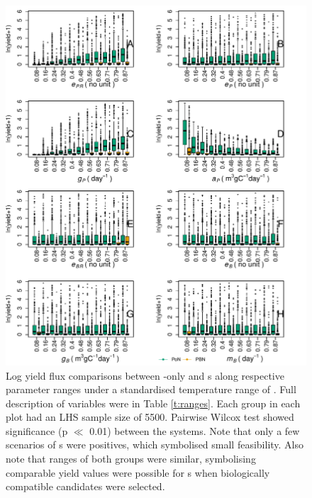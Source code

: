 \documentclass[../thesis.tex]{subfiles} %
\begin{document}
\begin{figure}[H]
    \centering
    \includegraphics[width=\linewidth]{result/bacEff.pdf}
    \caption[Log yield flux comparisons between \phy-only and \pbs s]{Log yield flux comparisons between \phy-only and \pbs s along respective parameter ranges under a standardised temperature range of \temp.  Full description of variables were in Table \ref{t:ranges}.  Each group in each plot had an LHS sample size of 5500.  Pairwise Wilcox test showed significance (p $\ll$ 0.01) between the systems.  Note that only a few scenarios of \pbs s were positives, which symbolised small feasibility.  Also note that ranges of both groups were similar, symbolising comparable yield values were possible for \pbs s when biologically compatible candidates were selected.}
    \label{f:bacEffect}
\end{figure}
\end{document}
